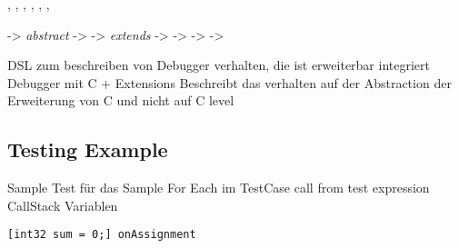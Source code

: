 , , 
, , 
, , 

	-> \emph{abstract} -> 
	-> \emph{extends} ->  
	-> 
	-> 
	-> 

 



DSL zum beschreiben von Debugger verhalten, 
die ist erweiterbar integriert Debugger mit C + Extensions
Beschreibt das verhalten auf der Abstraction 
der Erweiterung von C und nicht auf C level 
	
\subsection{Testing Example}
Sample
	Test für das Sample
		For Each im TestCase call from test expression
			CallStack
			Variablen
			
\begin{lstlisting}[language=reducedMbeddr]
	[int32 sum = 0;] onAssignment
\end{lstlisting}			
